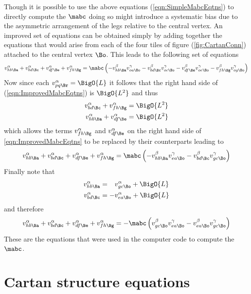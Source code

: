 \documentclass[a4paper,12pt]{article}
\numberwithin{equation}{section}
\begin{document}
Though it is possible to use the above equations (\ref{eqn:SimpleMabcEqtns}) to directly
compute the $\mabc$ doing so might introduce a systematic bias due to the asymmetric
arrangement of the legs relative to the central vertex. An improved set of equations can be
obtained simply by adding together the equations that would arise from each of the four
tiles of figure (\ref{fig:CartanConn}) attached to the central vertex $\Bo$. This leads to
the following set of equations
\begin{align}
   \label{eqn:ImprovedMabcEqtns}
   v^\alpha_{hb\Ba} + v^\alpha_{bd\Bc} + v^\alpha_{df\Be} + v^\alpha_{fh\Bg}
   =
   \mabc\left(-v^\beta_{hb\Ba} v^\gamma_{oa\Bo}
              -v^\beta_{bd\Bc} v^\gamma_{oc\Bo}
              -v^\beta_{df\Be} v^\gamma_{oe\Bo}
              -v^\beta_{fh\Bg} v^\gamma_{og\Bo}\right)
\end{align}
Now since each $v^\alpha_{pq\Br} = \BigO{L}$ it follows that the right hand side of
(\ref{eqn:ImprovedMabcEqtns}) is $\BigO{L^2}$ and thus
\begin{align}
   v^\alpha_{bd\Bc} + v^\alpha_{fh\Bg} &= \BigO{L^2}\\
   v^\alpha_{hb\Ba} + v^\alpha_{df\Be} &= \BigO{L^2}
\end{align}
which allows the terms $v^\alpha_{fh\Bg}$ and $v^\alpha_{df\Be}$ on the right hand side of
\ref{eqn:ImprovedMabcEqtns} to be replaced by their counterparts leading to
\begin{align}
   v^\alpha_{hb\Ba} + v^\alpha_{bd\Bc} + v^\alpha_{df\Be} + v^\alpha_{fh\Bg}
   =
   \mabc\left(-v^\beta_{hb\Ba} v^\gamma_{ea\Bo}
              -v^\beta_{bd\Bc} v^\gamma_{gc\Bo}\right)
\end{align}
Finally note that
\begin{align}
   v^\alpha_{hb\Ba} &= \phantom {-} v^\alpha_{gc\Bo} + \BigO{L}\\
   v^\alpha_{bd\Bc} &= - v^\alpha_{ea\Bo} + \BigO{L}
\end{align}
and therefore
\begin{align}
   \label{eqn:FinalMabcEqtns}
   v^\alpha_{hb\Ba} + v^\alpha_{bd\Bc} + v^\alpha_{df\Be} + v^\alpha_{fh\Bg}
   =
   - \mabc\left( v^\beta_{gc\Bo} v^\gamma_{ea\Bo}
                -v^\beta_{ea\Bo} v^\gamma_{gc\Bo}\right)
\end{align}
These are the equations that were used in the computer code to compute the $\mabc$.

\section{Cartan structure equations}
\label{sec:CartanEqtns}
\end{document}
